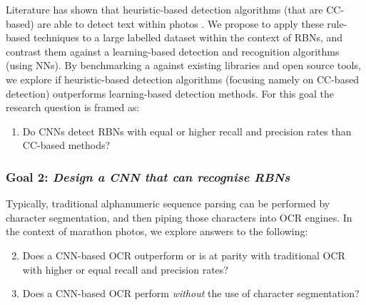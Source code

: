 Literature has shown that heuristic-based detection algorithms (that are CC-based) are able to detect text within photos \citep{Li:2012wd, Chen:2011ul, Eichner:2008dw}. We propose to apply these rule-based techniques to a large labelled dataset within the context of RBNs, and contrast them against a learning-based detection and recognition algorithms (using NNs). By benchmarking a against existing libraries and open source tools, we explore if heuristic-based detection algorithms (focusing namely on CC-based detection) outperforms learning-based detection methods.
For this goal the research question is framed as:
\begin{enumerate}[label=\bfseries~RQ\arabic*), leftmargin=2cm, rightmargin=1.5cm]
  \item\label{rq:1} Do CNNs detect RBNs with equal or higher recall and precision rates than CC-based methods?
\end{enumerate}

\subsubsection*{Goal 2: \itshape Design a CNN that can recognise RBNs}

Typically, traditional alphanumeric sequence parsing can be performed by character segmentation, and then piping those characters into OCR engines.
In the context of marathon photos, we explore answers to the following:
\begin{enumerate}[label=\bfseries~RQ\arabic*), leftmargin=2cm, rightmargin=1.5cm]
  \setcounter{enumi}{1}
  \item\label{rq:2} Does a CNN-based OCR outperform or is at parity with traditional OCR with higher or equal recall and precision rates?
  \item\label{rq:3} Does a CNN-based OCR perform \textit{without} the use of character segmentation?
\end{enumerate}

